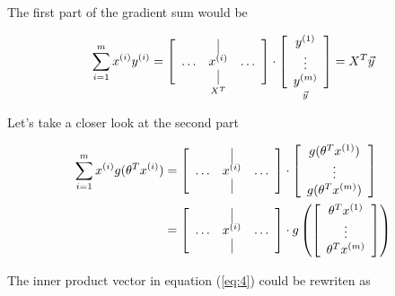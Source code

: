 \documentclass{article}
\begin{document}
The first part of the gradient sum would be

\[
\sum_{i=1}^m   x^{(i)} y^{(i)} = 
\underset{X^T}
{\left[
  \begin{array}{ccc}
     & \vrule & \\
    \ldots & x^{(i)} & \ldots \\
     & \vrule & 
  \end{array}
\right]}
\cdot
\underset{\vec{y}}
{\left[
  \begin{array}{c}
	y^{(1)} \\
	\vdots\\
	y^{(m)}
  \end{array}
\right]}
= X^T \vec{y}
\]

Let's take a closer look at the second part

\begin{align}
\sum_{i=1}^m   x^{(i)}  g({\theta^T}x^{(i)}) &= 
\left[
  \begin{array}{ccc}
     & \vrule & \\
    \ldots & x^{(i)} & \ldots \\
     & \vrule & 
  \end{array}
\right]
\cdot
\left[
  \begin{array}{c}
	g({\theta^T}x^{(1)}) \\
	\vdots\\
	g({\theta^T}x^{(m)})
  \end{array}
\right] \label{eq:3} \\
 &= 
\left[
  \begin{array}{ccc}
     & \vrule & \\
    \ldots & x^{(i)} & \ldots \\
     & \vrule & 
  \end{array}
\right]
\cdot
g\left(
\left[
  \begin{array}{c}
	{\theta^T}x^{(1)} \\
	\vdots\\
	{\theta^T}x^{(m)}
  \end{array}
\right]
\right) \label {eq:4}
\end{align}

The inner product vector in equation ({\ref{eq:4}}) could be rewriten as
\end{document}
